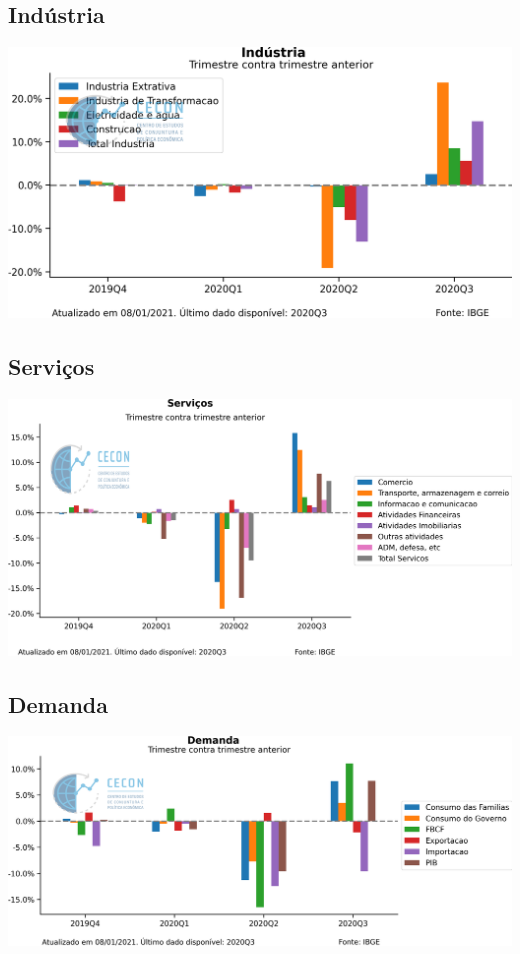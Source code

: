 \documentclass{SelfArx}
\begin{document}
\subsection*{Indústria}
\label{sec:org51cf245}

\begin{center}
\includegraphics[width=.9\linewidth]{./figs/PIB/Industria.png}
\end{center}


\subsection*{Serviços}
\label{sec:orgef01983}

\begin{center}
\includegraphics[width=.9\linewidth]{./figs/PIB/Servicos.png}
\end{center}

\subsection*{Demanda}
\label{sec:org1161c61}

\begin{center}
\includegraphics[width=.9\linewidth]{./figs/PIB/Demanda.png}
\end{center}
\end{document}
